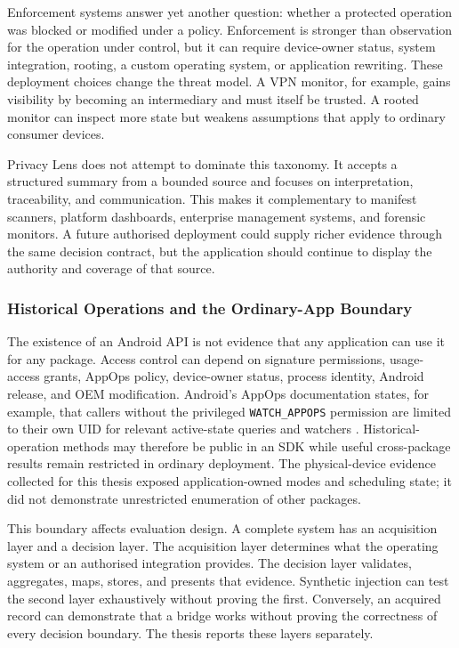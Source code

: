 Enforcement systems answer yet another question: whether a protected operation was blocked or modified under a policy. Enforcement is stronger than observation for the operation under control, but it can require device-owner status, system integration, rooting, a custom operating system, or application rewriting. These deployment choices change the threat model. A VPN monitor, for example, gains visibility by becoming an intermediary and must itself be trusted. A rooted monitor can inspect more state but weakens assumptions that apply to ordinary consumer devices.

Privacy Lens does not attempt to dominate this taxonomy. It accepts a structured summary from a bounded source and focuses on interpretation, traceability, and communication. This makes it complementary to manifest scanners, platform dashboards, enterprise management systems, and forensic monitors. A future authorised deployment could supply richer evidence through the same decision contract, but the application should continue to display the authority and coverage of that source.

\subsubsection{Historical Operations and the Ordinary-App Boundary}

The existence of an Android API is not evidence that any application can use it for any package. Access control can depend on signature permissions, usage-access grants, AppOps policy, device-owner status, process identity, Android release, and OEM modification. Android's AppOps documentation states, for example, that callers without the privileged \texttt{WATCH\_APPOPS} permission are limited to their own UID for relevant active-state queries and watchers \cite{androidappops2026}. Historical-operation methods may therefore be public in an SDK while useful cross-package results remain restricted in ordinary deployment. The physical-device evidence collected for this thesis exposed application-owned modes and scheduling state; it did not demonstrate unrestricted enumeration of other packages.

This boundary affects evaluation design. A complete system has an acquisition layer and a decision layer. The acquisition layer determines what the operating system or an authorised integration provides. The decision layer validates, aggregates, maps, stores, and presents that evidence. Synthetic injection can test the second layer exhaustively without proving the first. Conversely, an acquired record can demonstrate that a bridge works without proving the correctness of every decision boundary. The thesis reports these layers separately.

